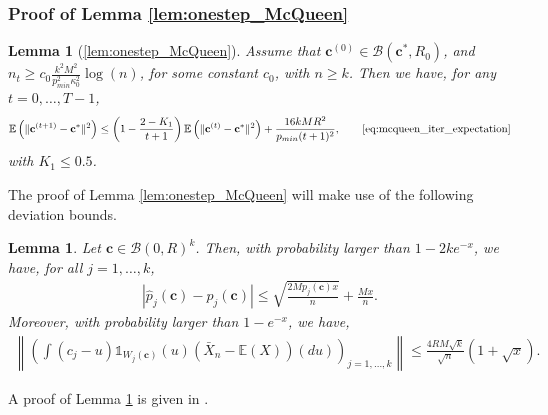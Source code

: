 \documentclass[noinfoline,preprint]{article}
\newtheorem{lem}[theorem]{Lemma}
\newtheorem*{lem*}{Lemma}
\newcommand{\cb}{\mathbf{c}}
\newcommand{\E}{\mathbb{E}}
\renewcommand{\1}{\mathds 1}
\newcommand{\B}{\mathcal{B}}
\begin{document}
\subsubsection{Proof of Lemma \ref{lem:onestep_McQueen}}\label{tecsec:proof_lemma_onestep_McQueen}
\begin{lem*}[\ref{lem:onestep_McQueen}]
Assume that $\cb^{(0)} \in \mathcal{B}(\cb^*,R_0)$, and $n_t \geq c_0 \frac{k^2M^2}{p_{min}^2 \kappa_0^2} \log(n)$, for some constant $c_0$, with $n \geq k$. Then we have, for any $t =0, \hdots, T-1$,
\begin{align*}
\E \left ( \| \cb^{(t+1)} - \cb^*\|^2 \right ) \leq \left ( 1 - \frac{2-K_1}{t+1} \right ) \E \left ( \| \cb^{(t)} - \cb^* \|^2 \right ) + \frac{16kMR^2}{p_{min}(t+1)^2}, \qquad \mbox{\eqref{eq:mcqueen_iter_expectation}}
\end{align*}
with $K_1 \leq 0.5$.
\end{lem*}
The proof of Lemma \ref{lem:onestep_McQueen} will make use of the following deviation bounds.
\begin{lem}\label{lem:concentration_McQueen}
Let $\cb \in \B(0,R)^k$. Then, with probability larger than $1-2ke^{-x}$, we have, for all $j=1, \hdots, k$,
\begin{align*}
|\hat{p}_j(\cb) - p_j(\cb)| \leq \sqrt{\frac{2Mp_j(\cb)x}{n}} + \frac{Mx}{n}.
\end{align*}
Moreover, with probability larger than $1-e^{-x}$, we  have, 
\begin{align*}
\left \| \left ( \int (c_j-u)\1_{W_j(\cb)}(u)(\bar{X}_n-\E(X))(du) \right )_{j=1, \hdots, k} \right \| \leq \frac{4RM\sqrt{k}}{\sqrt{n}} \left ( 1 + \sqrt{x} \right ).
\end{align*}
\end{lem}   
A proof of Lemma \ref{lem:concentration_McQueen} is given in .
\end{document}
